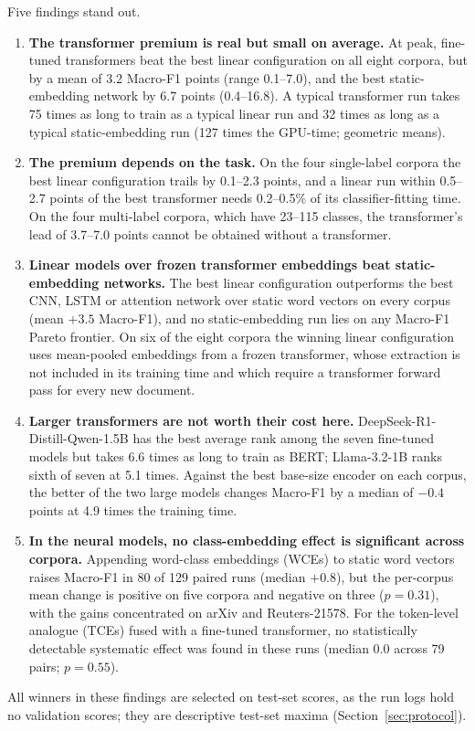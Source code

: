 \documentclass{ijis}
\begin{document}
Five findings stand out.
\begin{enumerate}
\setlength\itemsep{1pt}
\item \textbf{The transformer premium is real but small on average.} At peak, fine-tuned transformers beat the best linear configuration on all eight corpora, but by a mean of 3.2 Macro-F1 points (range 0.1--7.0), and the best static-embedding network by 6.7 points (0.4--16.8). A typical transformer run takes 75 times as long to train as a typical linear run and 32 times as long as a typical static-embedding run (127 times the GPU-time; geometric means).
\item \textbf{The premium depends on the task.} On the four single-label corpora the best linear configuration trails by 0.1--2.3 points, and a linear run within 0.5--2.7 points of the best transformer needs 0.2--0.5\% of its classifier-fitting time. On the four multi-label corpora, which have 23--115 classes, the transformer's lead of 3.7--7.0 points cannot be obtained without a transformer.
\item \textbf{Linear models over frozen transformer embeddings beat static-embedding networks.} The best linear configuration outperforms the best CNN, LSTM or attention network over static word vectors on every corpus (mean $+3.5$ Macro-F1), and no static-embedding run lies on any Macro-F1 Pareto frontier. On six of the eight corpora the winning linear configuration uses mean-pooled embeddings from a frozen transformer, whose extraction is not included in its training time and which require a transformer forward pass for every new document.
\item \textbf{Larger transformers are not worth their cost here.} DeepSeek-R1-Distill-Qwen-1.5B has the best average rank among the seven fine-tuned models but takes 6.6 times as long to train as BERT; Llama-3.2-1B ranks sixth of seven at 5.1 times. Against the best base-size encoder on each corpus, the better of the two large models changes Macro-F1 by a median of $-0.4$ points at 4.9 times the training time.
\item \textbf{In the neural models, no class-embedding effect is significant across corpora.} Appending word-class embeddings (WCEs) \cite{moreo2021} to static word vectors raises Macro-F1 in 80 of 129 paired runs (median $+0.8$), but the per-corpus mean change is positive on five corpora and negative on three ($p = 0.31$), with the gains concentrated on arXiv and Reuters-21578. For the token-level analogue (TCEs) fused with a fine-tuned transformer, no statistically detectable systematic effect was found in these runs (median 0.0 across 79 pairs; $p = 0.55$).
\end{enumerate}
All winners in these findings are selected on test-set scores, as the run logs hold no validation scores; they are descriptive test-set maxima (Section~\ref{sec:protocol}).
\end{document}
